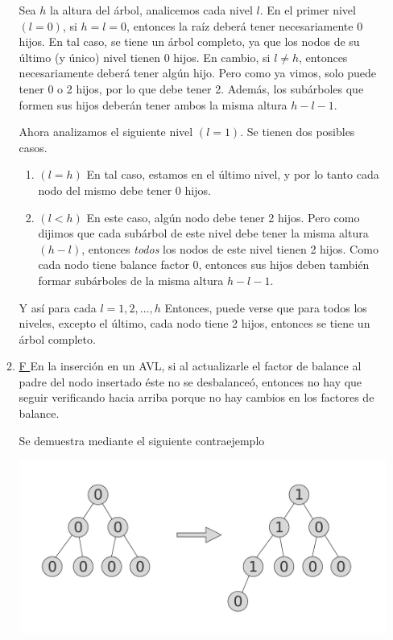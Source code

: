 \documentclass{article}
\begin{document}
\begin{enumerate}
\begin{enumerate}
Sea $h$ la altura del árbol, analicemos cada nivel $l$. En el primer nivel $(l=0)$, si $h=l=0$, entonces la raíz deberá tener necesariamente 0 hijos. En tal caso, se tiene un árbol completo, ya que los nodos de su último (y único) nivel tienen 0 hijos. En cambio, si $l\neq h$, entonces necesariamente deberá tener algún hijo. Pero como ya vimos, solo puede tener 0 o 2 hijos, por lo que debe tener 2. Además, los subárboles que formen sus hijos deberán tener ambos la misma altura $h-l-1$.

Ahora analizamos el siguiente nivel $(l=1)$. Se tienen dos posibles casos.
\begin{enumerate}
    \item $(l=h)$ En tal caso, estamos en el último nivel, y por lo tanto cada nodo del mismo debe tener 0 hijos.
    \item $(l<h)$ En este caso, algún nodo debe tener 2 hijos. Pero como dijimos que cada subárbol de este nivel debe tener la misma altura $(h-l)$, entonces \textit{todos} los nodos de este nivel tienen 2 hijos. Como cada nodo tiene balance factor 0, entonces sus hijos deben también formar subárboles de la misma altura $h-l-1$.
\end{enumerate}

Y así para cada $l = 1, 2, \dots, h$ Entonces, puede verse que para todos los niveles, excepto el último, cada nodo tiene 2 hijos, entonces se tiene un árbol completo.


\item \underline{ F } En la inserción en un AVL, si al actualizarle el factor de balance al padre del nodo insertado éste no se desbalanceó, entonces no hay que seguir verificando hacia arriba porque no hay cambios en los factores de balance.

Se demuestra mediante el siguiente contraejemplo

\begin{center}
    \includegraphics[scale=0.4]{./img/ej6c.pdf}
\end{center}


\end{enumerate}
\end{enumerate}
\end{document}
